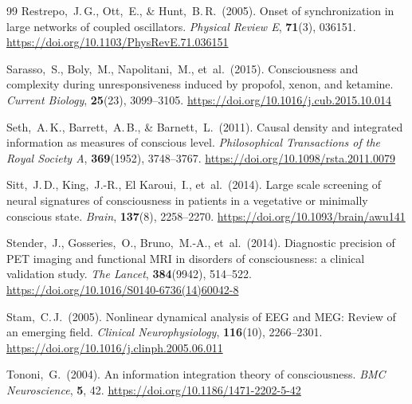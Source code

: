 ﻿\documentclass[11pt,a4paper]{article}
\theoremstyle{plain}
\theoremstyle{definition}
\theoremstyle{remark}
\begin{document}
\begin{thebibliography}{99}
Restrepo,~J.\,G., Ott,~E., \& Hunt,~B.\,R.\ (2005).
Onset of synchronization in large networks of coupled oscillators.
\textit{Physical Review E}, \textbf{71}(3), 036151.
\url{https://doi.org/10.1103/PhysRevE.71.036151}

Sarasso,~S., Boly,~M., Napolitani,~M., et~al.\ (2015).
Consciousness and complexity during unresponsiveness induced by propofol, xenon, and ketamine.
\textit{Current Biology}, \textbf{25}(23), 3099--3105.
\url{https://doi.org/10.1016/j.cub.2015.10.014}

Seth,~A.\,K., Barrett,~A.\,B., \& Barnett,~L.\ (2011).
Causal density and integrated information as measures of conscious level.
\textit{Philosophical Transactions of the Royal Society A}, \textbf{369}(1952), 3748--3767.
\url{https://doi.org/10.1098/rsta.2011.0079}

Sitt,~J.\,D., King,~J.-R., El Karoui,~I., et~al.\ (2014).
Large scale screening of neural signatures of consciousness in patients in a vegetative or minimally conscious state.
\textit{Brain}, \textbf{137}(8), 2258--2270.
\url{https://doi.org/10.1093/brain/awu141}

Stender,~J., Gosseries,~O., Bruno,~M.-A., et~al.\ (2014).
Diagnostic precision of PET imaging and functional MRI in disorders of consciousness: a clinical validation study.
\textit{The Lancet}, \textbf{384}(9942), 514--522.
\url{https://doi.org/10.1016/S0140-6736(14)60042-8}

Stam,~C.\,J.\ (2005).
Nonlinear dynamical analysis of EEG and MEG: Review of an emerging field.
\textit{Clinical Neurophysiology}, \textbf{116}(10), 2266--2301.
\url{https://doi.org/10.1016/j.clinph.2005.06.011}

Tononi,~G.\ (2004).
An information integration theory of consciousness.
\textit{BMC Neuroscience}, \textbf{5}, 42.
\url{https://doi.org/10.1186/1471-2202-5-42}

\end{thebibliography}
\end{document}

